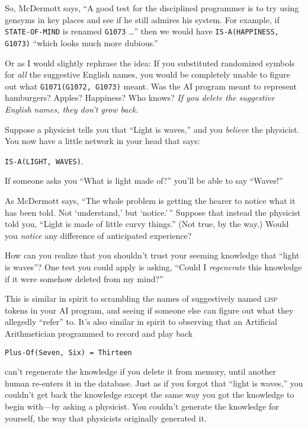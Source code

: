{
 So, McDermott says, ``A good test for the
disciplined programmer is to try using gensyms in key places and see if
he still admires his system. For example, if \texttt{STATE-OF-MIND} is renamed
\texttt{G1073} \ldots'' then we would have \texttt{IS-A(HAPPINESS,
G1073)} ``which looks much more
dubious.''}

{
 Or as I would slightly rephrase the idea: If you substituted
randomized symbols for \textit{all} the suggestive English names, you
would be completely unable to figure out what \texttt{G1071(G1072, G1073)}
meant. Was the AI program meant to represent hamburgers? Apples?
Happiness? Who knows? \textit{If you delete the suggestive English
names, they don't grow back.}}

{
 Suppose a physicist tells you that ``Light is
waves,'' and you \textit{believe} the physicist. You
now have a little network in your head that says:}

\begin{center}
\texttt{IS-A(LIGHT, WAVES)}.
\end{center}

{
 If someone asks you ``What is light made
of?'' you'll be able to say
``Waves!'' }

{
 As McDermott says, ``The whole problem is getting
the hearer to notice what it has been told. Not
`understand,' but
`notice.'\,'' Suppose
that instead the physicist told you, ``Light is made
of little curvy things.'' (Not true, by the way.)
Would you \textit{notice} any difference of anticipated experience?}

{
 How can you realize that you shouldn't trust your
seeming knowledge that ``light is
waves''? One test you could apply is asking,
``Could I \textit{regenerate} this knowledge if it
were somehow deleted from my mind?''}

{
 This is similar in spirit to scrambling the names of suggestively
named \textsc{lisp} tokens in your AI program, and seeing if someone else can
figure out what they allegedly
``refer'' to. It's
also similar in spirit to observing that an Artificial Arithmetician
programmed to record and play back}

\begin{center}
\texttt{Plus-Of(Seven, Six) = Thirteen}
\end{center}

{
 can't regenerate the knowledge if you delete it
from memory, until another human re-enters it in the database. Just as
if you forgot that ``light is
waves,'' you couldn't get back the
knowledge except the same way you got the knowledge to begin with---by
asking a physicist. You couldn't generate the knowledge
for yourself, the way that physicists originally generated it. }

